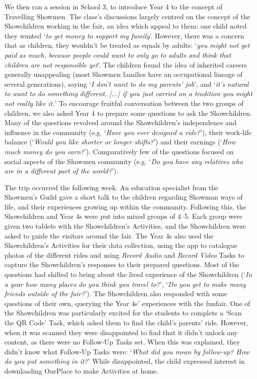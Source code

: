 \documentclass[,hyphens]{sigchi}
\begin{document}
We then ran a session in School 3, to introduce Year 4 to the concept of Travelling Showmen. The class's discussions largely centred on the concept of the Showchildren working in the fair, an idea which appeal to them: one child noted they wanted `\textit{to get money to support my family}'. However, there was a concern that as children, they wouldn't be treated as equals by adults: `\textit{you might not get paid as much, because people could want to only go to adults and think that children are not responsible yet}'. The children found the idea of inherited careers generally unappealing (most Showmen families have an occupational lineage of several generations), saying `\textit{I don't want to do my parents' job}', and `\textit{it's natural to want to do something different, [...] if you just carried on a tradition you might not really like it.}' To encourage fruitful conversation between the two groups of children, we also asked Year 4 to prepare some questions to ask the Showchildren. Many of the questions revolved around the Showchildren's independence and influence in the community (e.g. `\textit{Have you ever designed a ride?}'), their work-life balance (`\textit{Would you like shorter or longer shifts?}') and their earnings (`\textit{How much money do you earn?}'). Comparatively few of the questions focused on social aspects of the Showmen community (e.g. `\textit{Do you have any relatives who are in a different part of the world?}').

The trip occurred the following week. An education specialist from the Showmen's Guild gave a short talk to the children regarding Showman ways of life, and their experiences growing up within the community. Following this, the Showchildren and Year 4s were put into mixed groups of 4--5. Each group were given two tablets with the Showchildren's Activities, and the Showchildren were asked to guide the visitors around the fair. The Year 4s also used the Showchildren's Activities for their data collection, using the app to catalogue photos of the different rides and using \textit{Record Audio} and \textit{Record Video} Tasks to capture the Showchildren's responses to their prepared questions. Most of the questions had shifted to being about the lived experience of the Showchildren (`\textit{In a year how many places do you think you travel to?}', `\textit{Do you get to make many friends outside of the fair?}'). The Showchildren also responded with some questions of their own, querying the Year 4s' experiences with the funfair. One of the Showchildren was particularly excited for the students to complete a `Scan the QR Code' Task, which asked them to find the child's parents' ride. However, when it was scanned they were disappointed to find that it didn't unlock any content, as there were no Follow-Up Tasks set. When this was explained, they didn't know what Follow-Up Tasks were: `\textit{What did you mean by follow-up? How do you put something in it?}' While disappointed, the child expressed interest in downloading OurPlace to make Activities at home.
\end{document}
